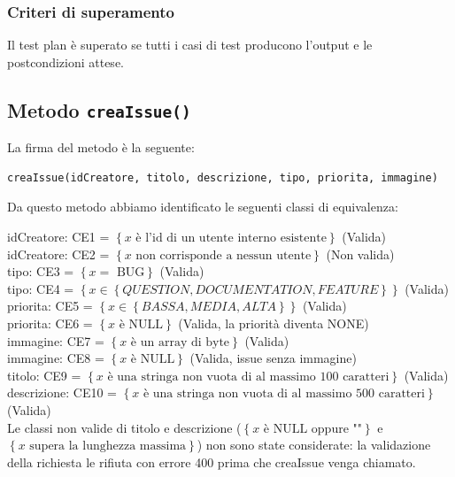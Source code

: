 \clearpage

\subsubsection{Criteri di superamento}
Il test plan è superato se tutti i casi di test producono l'output e 
le postcondizioni attese.

\subsection{Metodo \texttt{creaIssue()} }
La firma del metodo è la seguente: 

\begin{minipage}{\linewidth}
\centering\begin{verbatim}
creaIssue(idCreatore, titolo, descrizione, tipo, priorita, immagine) 
\end{verbatim}
\end{minipage}

Da questo metodo abbiamo identificato le seguenti classi di equivalenza: 

\noindent idCreatore: CE1 = $\left\{ x \text{ è l'id di un utente interno esistente} \right\}$ (Valida) \\
idCreatore: CE2 = $\left\{ x \text{ non corrisponde a nessun utente} \right\}$  (Non valida) \\
tipo: CE3 = $\left\{ x = \text{ BUG} \right\}$ (Valida) \\
tipo: CE4 = $\left\{ x \in \left\{ QUESTION, DOCUMENTATION, FEATURE \right\} \right\}$ (Valida) \\
priorita: CE5 =  $\left\{ x \in \left\{ BASSA, MEDIA, ALTA \right\} \right\}$ (Valida) \\
priorita: CE6 = $\left\{ x \text{ è NULL} \right\}$ (Valida, la priorità diventa NONE) \\
immagine: CE7 =  $\left\{ x \text{ è un array di byte} \right\}$ (Valida) \\
immagine: CE8 = $\left\{ x \text{ è NULL} \right\}$ (Valida, issue senza immagine) \\
titolo: CE9 = $\left\{ x \text{ è una stringa non vuota di al massimo 100 caratteri} \right\}$ (Valida) \\
descrizione: CE10 = $\left\{ x \text{ è una stringa non vuota di al massimo 500 caratteri} \right\}$ (Valida) \\

\noindent Le classi non valide di titolo e descrizione ($\left\{ x \text{ è NULL oppure ""} \right\}$ e \\
$\left\{ x \text{ supera la lunghezza massima} \right\}$) non 
sono state considerate: la validazione della richiesta le rifiuta con errore 400 prima che creaIssue venga chiamato.  


